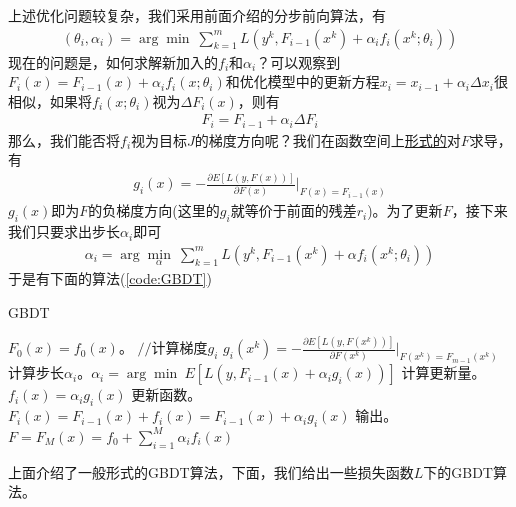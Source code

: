          上述优化问题较复杂，我们采用前面介绍的分步前向算法，有
          \begin{align*}
          (\theta_i,\alpha_i) = \arg\min \ \sum_{k=1}^m L(y^k,F_{i-1}(x^k)+\alpha_i f_i(x^k;\theta_i))
          \end{align*}
          现在的问题是，如何求解新加入的$f_i$和$\alpha_i$？可以观察到$F_i(x) =F_{i-1}(x)+\alpha_if_i(x;\theta_i)$和优化模型中的更新方程$x_{i} = x_{i-1}+\alpha_i \Delta x_i$很相似，如果将$f_i(x;\theta_i)$视为$\Delta F_i(x)$，则有
          \begin{align*}
          F_i = F_{i-1}+\alpha_i \Delta F_i
          \end{align*}
          那么，我们能否将$f_i$视为目标$J$的梯度方向呢？我们在函数空间上\underline{形式的}对$F$求导，有
          \begin{align*}
          g_i(x) = -\frac{\partial E[L(y,F(x))]}{\partial F(x)} \bigg|_{F(x) = F_{i-1}(x)}
          \end{align*}
          $g_i(x)$即为$F$的负梯度方向(这里的$g_i$就等价于前面的残差$r_i$)。为了更新$F$，接下来我们只要求出步长$\alpha_i$即可
          \begin{align*}
          \alpha_i = \arg\min_\alpha \ \sum_{k=1}^m L(y^k,F_{i-1}(x^k)+\alpha f_i(x^k;\theta_i))
          \end{align*}
          于是有下面的算法(\ref{code:GBDT})
          \begin{algorithm}[H]
              \caption{GBDT}\label{code:GBDT}
              \begin{algorithmic}[1]
                  \State $F_0(x) = f_0(x)$。
                      \State $//$计算梯度$g_i$
                          \State $g_i(x^k) = -\frac{\partial E[L(y,F(x^k))]}{\partial F(x^k)} \Big|_{F(x^k) = F_{m-1}(x^k)}$
                      \EndFor
                      \State 计算步长$\alpha_i$。$\alpha_i = \arg\min \ E[L(y,F_{i-1}(x)+\alpha_i g_i(x))]$
                      \State 计算更新量。$f_i(x) = \alpha_i g_i(x)$
                      \State 更新函数。$F_i(x) = F_{i-1}(x)+f_i(x) = F_{i-1}(x) +\alpha_i g_i(x)$
                  \EndFor
                  \State 输出。$F= F_M(x) = f_0 +　\sum_{i=1}^M \alpha_i f_i(x)$
              \end{algorithmic}
          \end{algorithm}
          \par
          上面介绍了一般形式的GBDT算法，下面，我们给出一些损失函数$L$下的GBDT算法。
